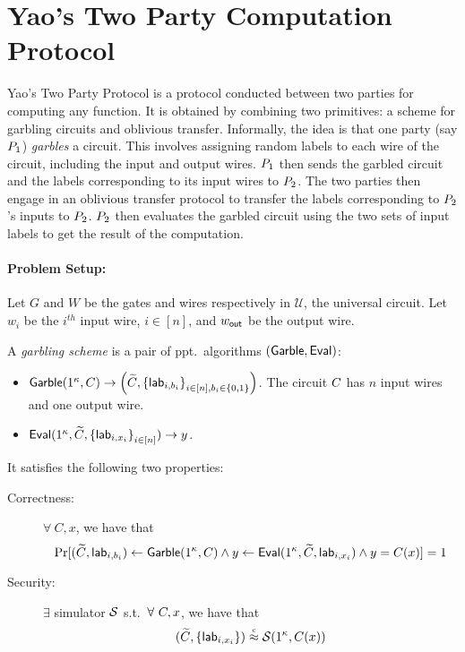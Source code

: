 
%

\section{Yao's Two Party Computation Protocol}

Yao's Two Party Protocol is a protocol conducted between two parties for
computing any function. It is obtained by combining two primitives: a scheme
for garbling circuits and oblivious transfer. Informally, the idea is that one
party (say $P_1$) \emph{garbles} a circuit. This involves assigning random
labels to each wire of the circuit, including the input and output wires.
$P_1$ then sends the garbled circuit and the labels corresponding to its
input wires to $P_2$. The two parties then engage in an oblivious
transfer protocol to transfer the labels corresponding to $P_2$'s inputs to
$P_2$. $P_2$ then evaluates the garbled circuit using the two sets of
input labels to get the result of the computation.

\paragraph{Problem Setup:}
Let  $G$ and $W$ be the gates and wires respectively in $\mathcal{U}$, the universal circuit.
Let $w_i$ be the $i^{th}$ input wire, $i \in [n]$, and $w_{\mathsf{out}}$ be the output wire.

\begin{definition}
  A \emph{garbling scheme} is a pair of ppt.\ algorithms $(\mathsf{Garble}, \mathsf{Eval})$:
  \begin{itemize}
    \item
      $\mathsf{Garble}(1^\kappa, C) \rightarrow \left(\widetilde{C}, \left\{\mathsf{lab}_{i, b_i}\right\}_{i\in
      [n], b_i \in \left\{0,1\right\}}\right)$. The circuit $C$ has $n$ input wires and one
      output wire.

    \item $\mathsf{Eval}(1^\kappa, \widetilde{C}, \left\{\mathsf{lab}_{i, x_i}\right\}_{i \in [n]}) \rightarrow y$.
  \end{itemize}
  It satisfies the following two properties:
  \begin{description}
    \item[Correctness:] $\forall\ C, x$, we have that
      \begin{equation*}\operatorname{Pr}[(\widetilde{C}, \mathsf{lab}_{i, b_i}) \gets \mathsf{Garble}(1^\kappa, C) \wedge
      y \gets \mathsf{Eval}(1^\kappa, \widetilde{C},\mathsf{lab}_{i,x_i}) \wedge
      y = C(x)] = 1\end{equation*}
    \item[Security:]
      $\exists$ simulator $\mathcal{S}$ s.t.\ $\forall\ C, x$, we have that
      \begin{equation*}
        (\GCir, \set{\Lab_{i, x_i}}) \indis \IdealAdv(1^\Param, C(x))
      \end{equation*}
  \end{description}
\end{definition}

